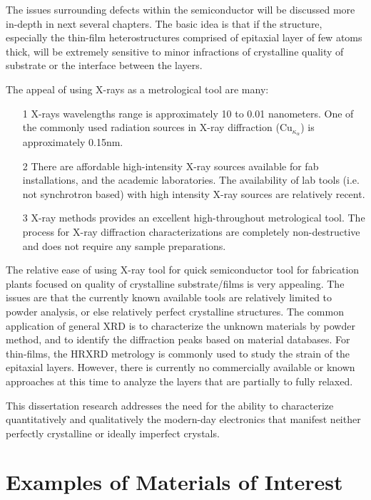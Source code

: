 The issues surrounding defects within the semiconductor will be discussed more in-depth in next several chapters.   The basic idea is that if the structure, especially the thin-film heterostructures comprised of epitaxial layer of few atoms thick, will be extremely sensitive to minor infractions of crystalline quality of substrate or the interface between the layers.  
 

The appeal of using X-rays as a metrological tool are many:  

{\SingleSpacing
\begin{itemize}
\item[1]  X-rays wavelengths range is approximately 10 to 0.01 nanometers.  One of the commonly used radiation sources in X-ray diffraction (Cu$_{\kappa_\alpha}$) is approximately 0.15nm.
\item[2]  There are affordable high-intensity X-ray sources available for fab installations, and the academic laboratories.  The availability of lab tools (i.e. not synchrotron based) with high intensity X-ray sources are relatively recent. 
\item[3] X-ray methods provides an excellent high-throughout metrological tool. The process for X-ray diffraction characterizations are completely non-destructive and does not require any sample preparations.
\end{itemize}
}
The relative ease of using X-ray tool for quick semiconductor tool for fabrication plants focused on quality of crystalline substrate/films is very appealing.  The issues are that the currently known available tools are relatively limited to powder analysis, or else relatively perfect crystalline structures.  The common application of general XRD is to characterize the unknown materials by powder method, and to identify the diffraction peaks based on material databases.  For thin-films, the HRXRD metrology is commonly used to study the strain of the epitaxial layers.  However, there is currently no commercially available or known approaches at this time to analyze the layers that are partially to fully relaxed.

This dissertation research addresses the need for the ability to characterize quantitatively and qualitatively the modern-day electronics that manifest neither perfectly crystalline or ideally imperfect crystals.  





\chapter{Examples of Materials of Interest}

